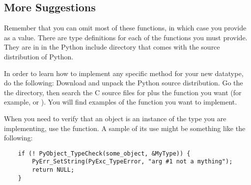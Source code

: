 \subsection{More Suggestions}

Remember that you can omit most of these functions, in which case you
provide  as a value.  There are type definitions for each of
the functions you must provide.  They are in  in the
Python include directory that comes with the source distribution of
Python.

In order to learn how to implement any specific method for your new
datatype, do the following: Download and unpack the Python source
distribution.  Go the the  directory, then search the
C source files for  plus the function you want (for
example,  or ).  You will find
examples of the function you want to implement.

When you need to verify that an object is an instance of the type
you are implementing, use the  function.
A sample of its use might be something like the following:

\begin{verbatim}
    if (! PyObject_TypeCheck(some_object, &MyType)) {
        PyErr_SetString(PyExc_TypeError, "arg #1 not a mything");
        return NULL;
    }
\end{verbatim}
